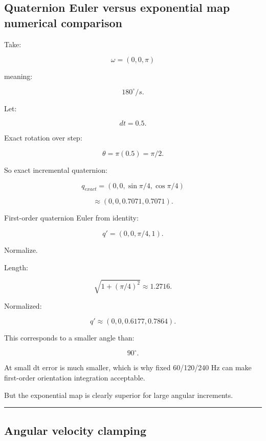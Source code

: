 \subsection{Quaternion Euler versus exponential map numerical comparison}\label{06-engine-ii-ch038-quaternion-euler-versus-exponential-map-numerical-comparison}

\hypertarget{06-engine-ii-ch038-quaternion-euler-versus-exponential-map-numerical-comparison}{}

Take:

\[
\omega=(0,0,\pi)
\]

meaning:

\[
180^\circ/s.
\]

Let:

\[
dt=0.5.
\]

Exact rotation over step:

\[
\theta
=
\pi(0.5)
=
\pi/2.
\]

So exact incremental quaternion:

\[
q_{exact}
=
(0,0,\sin\pi/4,\cos\pi/4)
\]

\[
\approx
(0,0,0.7071,0.7071).
\]

First-order quaternion Euler from identity:

\[
q'
=
(0,0,\pi/4,1).
\]

Normalize.

Length:

\[
\sqrt{
1+
(\pi/4)^2
}
\approx1.2716.
\]

Normalized:

\[
q'
\approx
(0,0,0.6177,0.7864).
\]

This corresponds to a smaller angle than:

\[
90^\circ.
\]

At small dt error is much smaller, which is why fixed 60/120/240 Hz can make first-order orientation integration acceptable.

But the exponential map is clearly superior for large angular increments.

\begin{center}\rule{0.5\linewidth}{0.5pt}\end{center}

\subsection{Angular velocity clamping}\label{06-engine-ii-ch038-angular-velocity-clamping}

\hypertarget{06-engine-ii-ch038-angular-velocity-clamping}{}

